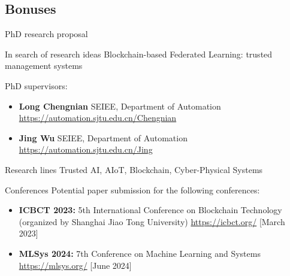 \subsection{Bonuses}

\begin{frame}{PhD research proposal}
\begin{block}{In search of research ideas}
  Blockchain-based Federated Learning: trusted management systems
\end{block}
PhD supervisors:
  \begin{itemize}
  	\item \textbf{Long Chengnian} SEIEE, Department of Automation \url{https://automation.sjtu.edu.cn/Chengnian}
  	\item \textbf{Jing Wu} SEIEE, Department of Automation \url{https://automation.sjtu.edu.cn/Jing}
  \end{itemize}
  \begin{alertblock}{Research lines}
    Trusted AI, AIoT, Blockchain, Cyber-Physical Systems
\end{alertblock}
\end{frame}

\begin{frame}{Conferences}
	Potential paper submission for the following conferences:
  \begin{itemize}
  	\item \textbf{ICBCT 2023:} 5th International Conference on Blockchain Technology (organized by Shanghai Jiao Tong University) \url{https://icbct.org/} [March 2023]
  	\item \textbf{MLSys 2024:} 7th Conference on Machine Learning and Systems  \url{https://mlsys.org/} [June 2024]
  \end{itemize}
\end{frame}